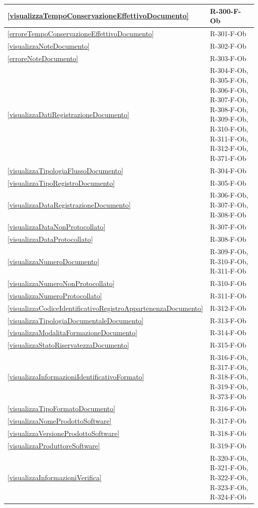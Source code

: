 \begin{longtable}{|p{4cm}|p{10cm}|}
\hline
\ref{visualizzaTempoConservazioneEffettivoDocumento} & R-300-F-Ob \\
\hline
\ref{erroreTempoConservazioneEffettivoDocumento} & R-301-F-Ob \\
\hline
\ref{visualizzaNoteDocumento} & R-302-F-Ob \\
\hline
\ref{erroreNoteDocumento} & R-303-F-Ob \\
\hline
\ref{visualizzaDatiRegistrazioneDocumento} & R-304-F-Ob, R-305-F-Ob, R-306-F-Ob, R-307-F-Ob, R-308-F-Ob, R-309-F-Ob, R-310-F-Ob, R-311-F-Ob, R-312-F-Ob, R-371-F-Ob \\
\hline
\ref{visualizzaTipologiaFlussoDocumento} & R-304-F-Ob \\
\hline
\ref{visualizzaTipoRegistroDocumento} & R-305-F-Ob \\
\hline
\ref{visualizzaDataRegistrazioneDocumento} & R-306-F-Ob, R-307-F-Ob, R-308-F-Ob \\
\hline
\ref{visualizzaDataNonProtocollato} & R-307-F-Ob \\
\hline
\ref{visualizzaDataProtocollato} & R-308-F-Ob \\
\hline
\ref{visualizzaNumeroDocumento} & R-309-F-Ob, R-310-F-Ob, R-311-F-Ob \\
\hline
\ref{visualizzaNumeroNonProtocollato} & R-310-F-Ob \\
\hline
\ref{visualizzaNumeroProtocollato} & R-311-F-Ob \\
\hline
\ref{visualizzaCodiceIdentificativoRegistroAppartenenzaDocumento} & R-312-F-Ob \\
\hline
\ref{visualizzaTipologiaDocumentaleDocumento} & R-313-F-Ob \\
\hline
\ref{visualizzaModalitaFormazioneDocumento} & R-314-F-Ob \\
\hline
\ref{visualizzaStatoRiservatezzaDocumento} & R-315-F-Ob \\
\hline
\ref{visualizzaInformazioniIdentificativoFormato} & R-316-F-Ob, R-317-F-Ob, R-318-F-Ob, R-319-F-Ob, R-373-F-Ob \\
\hline
\ref{visualizzaTipoFormatoDocumento} & R-316-F-Ob \\
\hline
\ref{visualizzaNomeProdottoSoftware} & R-317-F-Ob \\
\hline
\ref{visualizzaVersioneProdottoSoftware} & R-318-F-Ob \\
\hline
\ref{visualizzaProduttoreSoftware} & R-319-F-Ob \\
\hline
\ref{visualizzaInformazioniVerifica} & R-320-F-Ob, R-321-F-Ob, R-322-F-Ob, R-323-F-Ob, R-324-F-Ob \\

\end{longtable}
